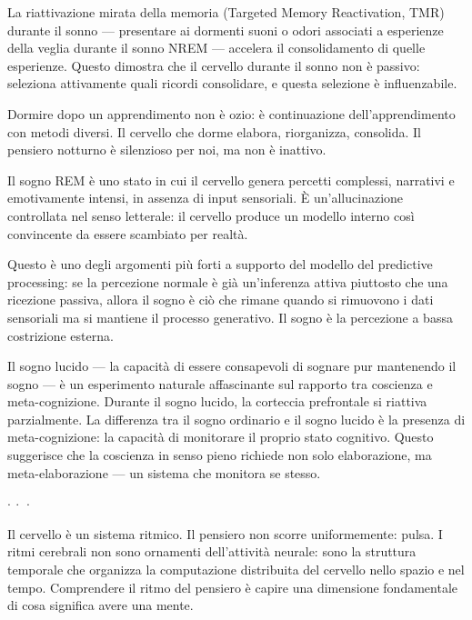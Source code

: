 \documentclass[12pt,a4paper,openany]{book}
\newcommand{\sezione}[1]{\vspace{1.2em}{\large\bfseries #1}\vspace{0.5em}\par}
\newcommand{\puntini}{\begin{center}$\cdot\ \cdot\ \cdot$\end{center}\vspace{0.3em}}
\begin{document}
La riattivazione mirata della memoria (Targeted Memory Reactivation, TMR) durante il sonno --- presentare ai dormenti suoni o odori associati a esperienze della veglia durante il sonno NREM --- accelera il consolidamento di quelle esperienze. Questo dimostra che il cervello durante il sonno non è passivo: seleziona attivamente quali ricordi consolidare, e questa selezione è influenzabile.

Dormire dopo un apprendimento non è ozio: è continuazione dell'apprendimento con metodi diversi. Il cervello che dorme elabora, riorganizza, consolida. Il pensiero notturno è silenzioso per noi, ma non è inattivo.

\sezione{La coscienza del sogno: un esperimento naturale}

Il sogno REM è uno stato in cui il cervello genera percetti complessi, narrativi e emotivamente intensi, in assenza di input sensoriali. È un'allucinazione controllata nel senso letterale: il cervello produce un modello interno così convincente da essere scambiato per realtà.

Questo è uno degli argomenti più forti a supporto del modello del predictive processing: se la percezione normale è già un'inferenza attiva piuttosto che una ricezione passiva, allora il sogno è ciò che rimane quando si rimuovono i dati sensoriali ma si mantiene il processo generativo. Il sogno è la percezione a bassa costrizione esterna.

Il sogno lucido --- la capacità di essere consapevoli di sognare pur mantenendo il sogno --- è un esperimento naturale affascinante sul rapporto tra coscienza e meta-cognizione. Durante il sogno lucido, la corteccia prefrontale si riattiva parzialmente. La differenza tra il sogno ordinario e il sogno lucido è la presenza di meta-cognizione: la capacità di monitorare il proprio stato cognitivo. Questo suggerisce che la coscienza in senso pieno richiede non solo elaborazione, ma meta-elaborazione --- un sistema che monitora se stesso.

\puntini

Il cervello è un sistema ritmico. Il pensiero non scorre uniformemente: pulsa. I ritmi cerebrali non sono ornamenti dell'attività neurale: sono la struttura temporale che organizza la computazione distribuita del cervello nello spazio e nel tempo. Comprendere il ritmo del pensiero è capire una dimensione fondamentale di cosa significa avere una mente.

\end{document}
